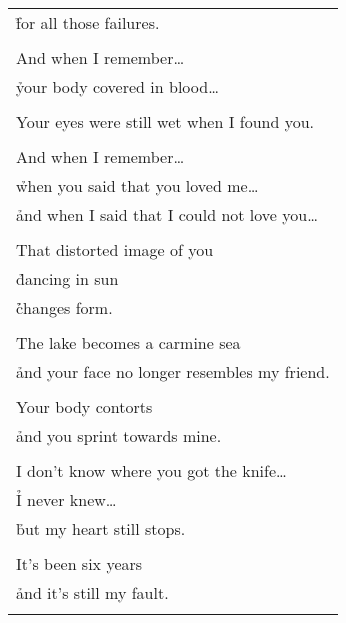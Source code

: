 \documentclass{article}
\begin{document}
\begin{center}
\begin{tabular}{l}
\h for all those failures. \\
\\
And when I remember\ldots{} \\
\h your body covered in blood\ldots{} \\
\\
Your eyes were still wet when I found you. \\
\\
And when I remember\ldots{} \\
\h when you said that you loved me\ldots{} \\
\h and when I said that I could not love you\ldots{} \\
\\
That distorted image of you \\
\h dancing in sun \\
\h\h changes form. \\
\\
The lake becomes a carmine sea \\
\h and your face no longer resembles my friend. \\
\\
Your body contorts \\
\h and you sprint towards mine. \\
\\
I don't know where you got the knife\ldots{} \\
\h I never knew\ldots{} \\
\h but my heart still stops. \\
\\
It's been six years \\
\h and it's still my fault. \\
\\
\end{tabular}
%
%
%
%
%

\end{center}
\end{document}
